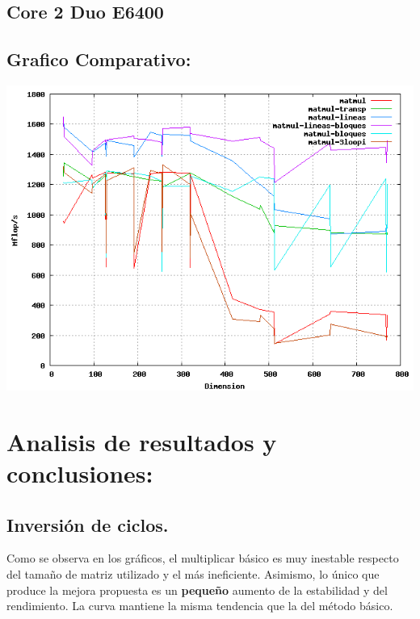 \documentclass[a4paper,10pt]{article}
\begin{document}
\subsection{Core 2 Duo E6400}


\clearpage

\clearpage

\clearpage

\clearpage

\clearpage

\clearpage

\subsection{Grafico Comparativo: }

\hspace{-2cm}
\includegraphics[width=15cm, bb=0 0 640 480]{core2-plot.png}
\clearpage

\section{Analisis de resultados y conclusiones: }

\subsection{Inversión de ciclos.}

Como se observa en los gráficos, el multiplicar básico es muy inestable respecto del tamaño de matriz utilizado y el más ineficiente. Asimismo, lo único que produce la mejora propuesta es un \textbf{pequeño} aumento de la estabilidad y del rendimiento. La curva mantiene la misma tendencia que la del método básico.
\end{document}
